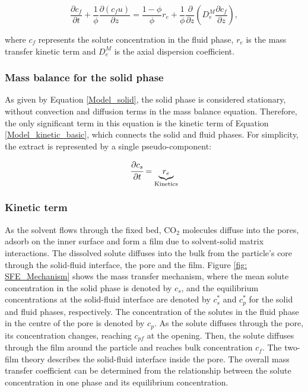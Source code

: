 \documentclass[a4paper,fleqn]{cas-dc}
\begin{document}
	{\footnotesize
		\begin{equation}
			\label{Model_fluid}
			\frac{\partial c_f}{\partial t}
			+ \frac{1}{\phi} \frac{\partial \left( c_f u\right)}{\partial z}
			= \frac{1-\phi}{\phi} r_e
			+ \frac{1}{\phi} \frac{\partial}{\partial z} \left( D^M_e \frac{\partial c_f}{\partial z} \right),
		\end{equation}
	}
	
	where $c_f$ represents the solute concentration in the fluid phase, $r_e$ is the mass transfer kinetic term and $D^M_e$ is the axial dispersion coefficient.
	
	\subsubsection{Mass balance for the solid phase} \label{Mass_balance_solid}
	
	As given by Equation \ref{Model_solid}, the solid phase is considered stationary, without convection and diffusion terms in the mass balance equation. Therefore, the only significant term in this equation is the kinetic term of Equation \ref{Model_kinetic_basic}, which connects the solid and fluid phases. For simplicity, the extract is represented by a single pseudo-component: 
	
	{\footnotesize
		\begin{equation} 
			\label{Model_solid}
			\cfrac{\partial c_s}{\partial t} = \underbrace{ r_e }_{\text{Kinetics}}
	\end{equation} }
	
	\subsubsection{Kinetic term} \label{CH: Kinetic}
	
	As the solvent flows through the fixed bed, CO$_2$ molecules diffuse into the pores, adsorb on the inner surface and form a film due to solvent-solid matrix interactions. The dissolved solute diffuses into the bulk from the particle's core through the solid-fluid interface, the pore and the film. Figure \ref{fig: SFE_Mechanism} shows the mass transfer mechanism, where the mean solute concentration in the solid phase is denoted by $c_s$, and the equilibrium concentrations at the solid-fluid interface are denoted by $c_s^*$ and $c_p^*$ for the solid and fluid phases, respectively. The concentration of the solutes in the fluid phase in the centre of the pore is denoted by $c_p$. As the solute diffuses through the pore, its concentration changes, reaching $c_{pf}$ at the opening. Then, the solute diffuses through the film around the particle and reaches bulk concentration $c_f$. The two-film theory describes the solid-fluid interface inside the pore. The overall mass transfer coefficient can be determined from the relationship between the solute concentration in one phase and its equilibrium concentration.
	
\end{document}
